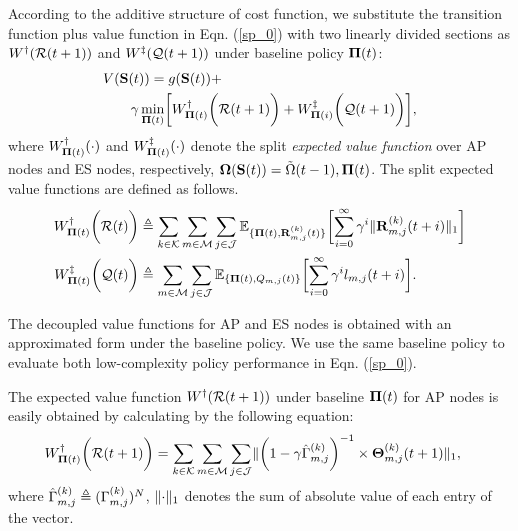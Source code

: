 According to the additive structure of cost function, we substitute the transition function plus value function in Eqn. (\ref{sp_0}) with two linearly divided sections as $W^{\dagger}(\mathcal{R}({t+1}))$ and $W^{\ddagger}(\mathcal{Q}({t+1}))$ under baseline policy $\boldsymbol{\Pi}({t})$:
\begin{align}
    &V(\Stat({t})) = g(\Stat({t})) +
    \nonumber\\
    &~~~~~~\gamma \min_{\BaseLine({t})} \Bracket{ W^{\AP}_{\BaseLine({t})}\Paren{\mathcal{R}({t+1})} + W^{\ES}_{\BaseLine({i})}\Paren{\mathcal{Q}({t+1})} },
\end{align}
where $W^{\dagger}_{\boldsymbol{\Pi}({t})}(\cdot)$ and $W^{\ddagger}_{\boldsymbol{\Pi}({t})}(\cdot)$ denote the split \emph{expected value function} over AP nodes and ES nodes, respectively, $\boldsymbol{\Omega}(\mathbf{S}({t})) = \tilde{\Omega}({t-1}), \boldsymbol{\Pi}({t})$. The split expected value functions are defined as follows.
\begin{align}
    W^{\AP}_{\BaseLine({t})}\Paren{\mathcal{R}({t})}
        &\define \sum_{k\in\apSet}\sum_{m\in\esSet}\sum_{j\in\jSpace}
        \mathbb{E}_{\{\BaseLine({t}), \vec{R}^{(k)}_{m,j}({t})\}}\Bracket{
            \sum_{i=0}^{\infty} \gamma^{i} \Inorm{\vec{R}^{(k)}_{m,j}({t+i})}
        }
    \\
    W^{\ES}_{\BaseLine({t})}\Paren{\mathcal{Q}({t})}
        &\define \sum_{m\in\esSet}\sum_{j\in\jSpace}
        \mathbb{E}_{\{\BaseLine({t}), Q_{m,j}({t})\}}\Bracket{
            \sum_{i=0}^{\infty} \gamma^{i} l_{m,j}({t+i})
        }.
\end{align}
        
The decoupled value functions for AP and ES nodes is obtained with an approximated form under the baseline policy. We use the same baseline policy to evaluate both low-complexity policy performance in Eqn. (\ref{sp_0}).

The expected value function $W^{\dagger}(\mathcal{R}({t+1}))$ under baseline $\boldsymbol{\Pi}({t})$ for AP nodes is easily obtained by calculating by the following equation:
\begin{align}
    &W^{\dagger}_{\boldsymbol{\Pi}({t})}\bigg(\mathcal{R}({t+1})\bigg) = \sum_{k\in\mathcal{K}}\sum_{m\in\mathcal{M}}\sum_{j\in\mathcal{J}}
    \lVert
        \bigg(1 - \gamma \hat{\Gamma}^{(k)}_{m,j}\bigg)^{-1}
        \times \boldsymbol{\Theta}^{(k)}_{m,j}({t+1})
    \|_1,
    \label{w_ap}
\end{align}
where $\hat{\Gamma}^{(k)}_{m,j} \triangleq (\Gamma^{(k)}_{m,j})^{N}$, $\lVert\cdot\|_1$ denotes the sum of absolute value of each entry of the vector.

